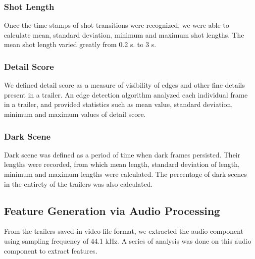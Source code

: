 \documentclass[letterpaper, 10 pt, conference]{ieeeconf}  %
\begin{document}
\subsubsection{Shot Length}
Once the time-stamps of shot transitions were recognized, we were able to calculate mean, standard deviation, minimum and maximum shot lengths. The mean shot length varied greatly from 0.2 s. to 3 s.
\subsubsection{Detail Score}
We defined detail score as a measure of visibility of edges and other fine details present in a trailer. An edge detection algorithm analyzed each individual frame in a trailer, and provided statistics such as mean value, standard deviation, minimum and maximum values of detail score.
\subsubsection{Dark Scene}
Dark scene was defined as a period of time when dark frames persisted. Their lengths were recorded, from which mean length, standard deviation of length, minimum and maximum lengths were calculated. The percentage of dark scenes in the entirety of the trailers was also calculated. 

\subsection{Feature Generation via Audio Processing}
From the trailers saved in video file format, we extracted the audio component using sampling frequency of 44.1 kHz. A series of analysis was done on this audio component to extract features.
\end{document}
